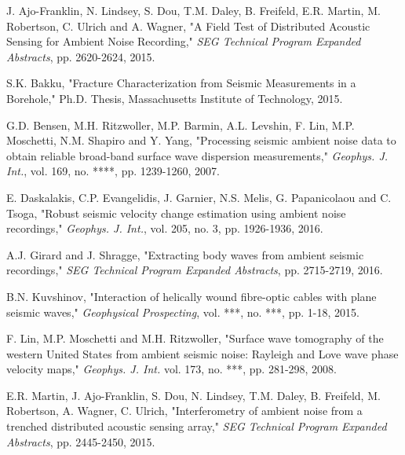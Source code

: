 \documentclass[11pt]{article}
\begin{document}
\begin{thebibliography}{30} %

 J. Ajo-Franklin, N. Lindsey, S. Dou, T.M. Daley, B. Freifeld, E.R. Martin, M. Robertson, C. Ulrich and A. Wagner, "A Field Test of Distributed Acoustic Sensing for Ambient Noise Recording," \textit{SEG Technical Program Expanded Abstracts}, pp. 2620-2624, 2015.

 S.K. Bakku, "Fracture Characterization from Seismic Measurements in a Borehole," Ph.D. Thesis, Massachusetts Institute of Technology, 2015.

 G.D. Bensen, M.H. Ritzwoller, M.P. Barmin, A.L. Levshin, F. Lin, M.P. Moschetti, N.M. Shapiro and Y. Yang, "Processing seismic ambient noise data to obtain reliable broad-band surface wave dispersion measurements," \textit{Geophys. J. Int.}, vol. 169, no. ****, pp. 1239-1260, 2007.

 E. Daskalakis, C.P. Evangelidis, J. Garnier, N.S. Melis, G. Papanicolaou and C. Tsoga, "Robust seismic velocity change estimation using ambient noise recordings," \textit{Geophys. J. Int.}, vol. 205, no. 3, pp. 1926-1936, 2016.

 A.J. Girard and J. Shragge, "Extracting body waves from ambient seismic recordings," \textit{SEG Technical Program Expanded Abstracts}, pp. 2715-2719, 2016.

 B.N. Kuvshinov, "Interaction of helically wound fibre-optic cables with plane seismic waves," \textit{Geophysical Prospecting}, vol. ***, no. ***, pp. 1-18, 2015.

 F. Lin, M.P. Moschetti and M.H. Ritzwoller, "Surface wave tomography of the western United States from ambient seismic noise: Rayleigh and Love wave phase velocity maps," \textit{Geophys. J. Int.} vol. 173, no. ***, pp. 281-298, 2008.

 E.R. Martin, J. Ajo-Franklin, S. Dou, N. Lindsey, T.M. Daley, B. Freifeld, M. Robertson, A. Wagner, C. Ulrich, "Interferometry of ambient noise from a trenched distributed acoustic sensing array," \textit{SEG Technical Program Expanded Abstracts}, pp. 2445-2450, 2015.


\end{thebibliography}
\end{document}
